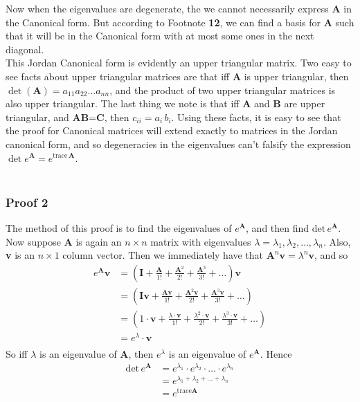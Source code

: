 Now when the eigenvalues are degenerate, the we cannot necessarily express \textbf{A} in the Canonical form. But according to Footnote \textbf{12}, we can find a basis for \textbf{A} such that it will be in the Canonical form with at most some ones in the next diagonal.\\ This Jordan Canonical form is evidently an upper triangular matrix. Two easy to see facts about upper triangular matrices are that iff \textbf{A} is upper triangular, then $\det (\textbf{A})=a_{11}a_{22}\ldots a_{nn}$, and the product of two upper triangular matrices is also upper triangular. The last thing we note is that iff \textbf{A} and \textbf{B} are upper triangular, and \textbf{A}\textbf{B}=\textbf{C}, then $c_{ii}=a_i\, b_i$. Using these facts, it is easy to see that the proof for Canonical matrices will extend exactly to matrices in the Jordan canonical form, and so degeneracies in the eigenvalues can't falsify the expression $\det e^\textbf{A}=e^{\text{trace}\,\textbf{A}}$.\\ \\ 

\subsubsection*{Proof 2}
The method of this proof is to find the eigenvalues of $e^{\mathbf{A}}$, and then find $\text{det}\,e^\mathbf{A}$. Now suppose \textbf{A} is again an $n\times n$ matrix with eigenvalues $\lambda=\lambda_1,\lambda_2,\ldots,\lambda_n$. Also, \textbf{v} is an $n\times 1$ column vector. Then we immediately have that $\mathbf{A}^n\mathbf{v}=\lambda^n\mathbf{v}$, and so
\begin{align*}
e^\mathbf{A}\mathbf{v}&=\left (\mathbf{I}+\frac{\mathbf{A}}{1!}+\frac{\mathbf{A}^2}{2!}+\frac{\mathbf{A}^3}{3!}+\ldots\right )\mathbf{v}\\
&=\left (\mathbf{I}\mathbf{v}+\frac{\mathbf{A}\mathbf{v}}{1!}+\frac{\mathbf{A}^2\mathbf{v}}{2!}+\frac{\mathbf{A}^3\mathbf{v}}{3!}+\ldots\right )\\
&=\left (1\cdot\mathbf{v}+\frac{\lambda\cdot\mathbf{v}}{1!}+\frac{\lambda^2\cdot\mathbf{v}}{2!}+\frac{\lambda^3\cdot\mathbf{v}}{3!}+\ldots\right )\\
&=e^\lambda \cdot \mathbf{v}\\
\end{align*}
So iff $\lambda$ is an eigenvalue of \textbf{A}, then $e^\lambda$ is an eigenvalue of $e^\mathbf{A}$. Hence 
\begin{align*}
\text{det}\,e^\mathbf{A}&=e^{\lambda_1}\cdot e^{\lambda_2}\cdot \ldots \cdot e^{\lambda_n}\\
&=e^{\lambda_1+\lambda_2+\ldots +\lambda_n}\\
&=e^{\text{trace}\mathbf{A}}
\end{align*}


